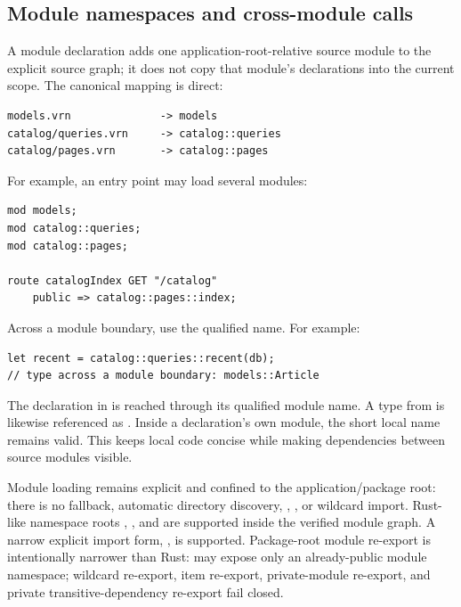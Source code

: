\subsection*{Module namespaces and cross-module calls}

A module declaration adds one application-root-relative source module to the explicit source graph; it does not copy that module's declarations into the current scope. The canonical mapping is direct:

\begin{lstlisting}
models.vrn              -> models
catalog/queries.vrn     -> catalog::queries
catalog/pages.vrn       -> catalog::pages
\end{lstlisting}

For example, an entry point may load several modules:

\begin{lstlisting}[language=Velran]
mod models;
mod catalog::queries;
mod catalog::pages;

route catalogIndex GET "/catalog"
    public => catalog::pages::index;
\end{lstlisting}

Across a module boundary, use the qualified name. For example:

\begin{lstlisting}[language=Velran]
let recent = catalog::queries::recent(db);
// type across a module boundary: models::Article
\end{lstlisting}

The declaration in  is reached through its qualified module name. A type from  is likewise referenced as . Inside a declaration's own module, the short local name remains valid. This keeps local code concise while making dependencies between source modules visible.

Module loading remains explicit and confined to the application/package root: there is no  fallback, automatic directory discovery, , , or wildcard import. Rust-like namespace roots , , and  are supported inside the verified module graph. A narrow explicit import form, , is supported. Package-root module re-export is intentionally narrower than Rust:  may expose only an already-public module namespace; wildcard re-export, item re-export, private-module re-export, and private transitive-dependency re-export fail closed.

